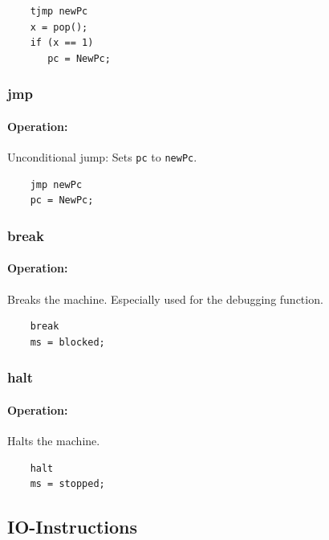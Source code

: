 	\begin{lstlisting}
	tjmp newPc
	x = pop();
	if (x == 1)
	   pc = NewPc;
	\end{lstlisting}

\subsubsection{jmp}

\paragraph{Operation:}
Unconditional jump: Sets \lstinline$pc$ to \lstinline$newPc$.

	\begin{lstlisting}
	jmp newPc
	pc = NewPc;
	\end{lstlisting}

\subsubsection{break}

\paragraph{Operation:}
Breaks the machine. Especially used for the debugging function.

	\begin{lstlisting}
	break
	ms = blocked;
	\end{lstlisting}

\subsubsection{halt}

\paragraph{Operation:}
Halts the machine.

	\begin{lstlisting}
	halt
	ms = stopped;
	\end{lstlisting}
	

\subsection{IO-Instructions}

